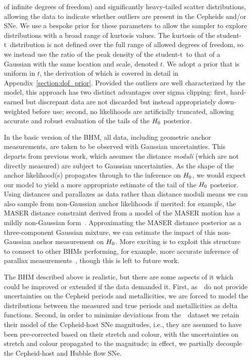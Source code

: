 \documentclass[a4paper,fleqn,usenatbib]{mnras}
\newcommand{\riess}{\citetalias{Riess_etal:2016}}
\newcommand{\tpeak}{t}
\newcommand{\studentdist}{student-t}
\begin{document}
{of infinite degrees of freedom) and significantly heavy-tailed 
scatter distributions, allowing the data to indicate whether
outliers are present in the Cepheids and/or SNe. We use a bespoke prior 
for these parameters to allow the sampler to explore distributions 
with a broad range of kurtosis values. The kurtosis of the \studentdist\ distribution is not defined over the full range of allowed degrees of freedom, so we instead use the ratio of the peak density of the \studentdist\ to that of a Gaussian with the same location and scale, denoted $\tpeak$. We adopt a prior that is uniform in $\tpeak$, the derivation of which is covered in detail in Appendix~\ref{section:dof_prior}. Provided the outliers are well characterized by the model, this approach has two distinct advantages over sigma clipping: first, hard-earned but discrepant data are not discarded but instead appropriately down-weighted before use; second, no likelihoods are artificially truncated, allowing accurate and robust evaluation of the tails of the $H_0$ posterior.

In the basic version of the BHM, all data, including geometric anchor measurements, are taken to be observed with Gaussian uncertainties. This departs from previous work, which assumes the distance {\em moduli} (which are not directly measured) are subject to Gaussian uncertainties. As the shape of the anchor likelihood(s) propagates through to the inference on $H_0$, we would expect our model to yield a more appropriate estimate of the tail of the $H_0$ posterior. Using distances and parallaxes as data rather than distance moduli means we can also sample from non-Gaussian anchor likelihoods if merited: for example, the MASER distance constraint derived from a model of the MASER motion has a mildly non-Gaussian form~\citep{Humphreys_etal:2013,Riess_etal:2016}. Approximating the MASER distance posterior as a three-component Gaussian mixture, we can estimate the impact of this non-Gaussian anchor measurement on $H_0$. More exciting is to exploit this structure to connect to other BHMs performing, for example, more accurate inference of parallax measurements~\citep{Sesar_etal:2016}, though this is left to 
future work. 

The BHM described above is realistic, but there are some aspects of it which could be improved or extended if the data demanded it.
First, as~\riess\ do not provide uncertainties on the Cepheid periods and metallicities, we are forced to model the distributions between the measured and true periods and metallicities as delta functions. Second, in order to minimize deviations from the~\riess\ dataset we retain their model of the Cepheid-host SNe magnitudes, i.e., they are assumed to have been pre-corrected based on their stretch and colour, with the uncertainties on stretch and colour propagated to the magnitude; in effect, we partially decouple the Cepheid-host and Hubble flow SNe.

}
\end{document}
